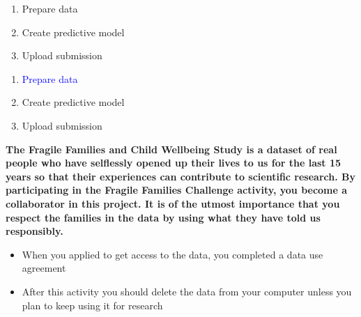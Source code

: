 \documentclass[aspectratio=169]{beamer}
\begin{document}
\begin{frame}

\begin{enumerate}
\item Prepare data
\item Create predictive model
\item Upload submission
\end{enumerate}

\end{frame}
\begin{frame}

\begin{enumerate}
\item \textcolor{blue}{Prepare data}
\item Create predictive model
\item Upload submission
\end{enumerate}

\end{frame}
\begin{frame}

\textbf{The Fragile Families and Child Wellbeing Study is a dataset of real people who have selflessly opened up their lives to us for the last 15 years so that their experiences can contribute to scientific research. By participating in the Fragile Families Challenge activity, you become a collaborator in this project. It is of the utmost importance that you respect the families in the data by using what they have told us responsibly.}

\end{frame}
\begin{frame}

\begin{itemize}
\item When you applied to get access to the data, you completed a data use agreement
\pause
\item After this activity you should delete the data from your computer unless you plan to keep using it for research
\end{itemize}

\end{frame}
\end{document}
